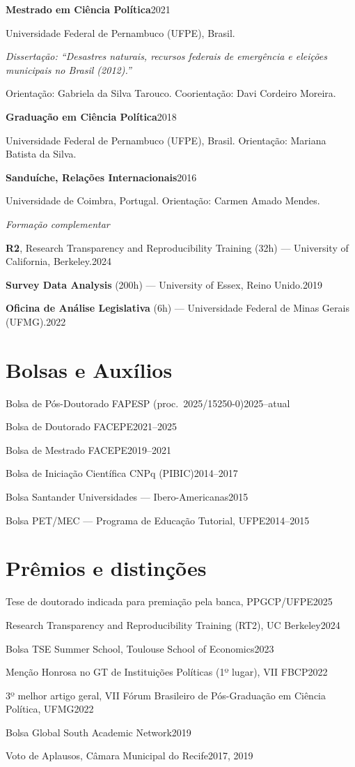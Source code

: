 \documentclass[11pt]{article}
\newcommand{\cvsubsection}[1]{\vspace{0.9em}\textit{#1}\par\vspace{0.35em}}
\newcommand{\entry}[2]{\noindent\textbf{#1}\hfill #2\par\vspace{0.15em}}
\newcommand{\entryplain}[2]{\noindent#1\hfill #2\par\vspace{0.15em}}
\newcommand{\detail}[1]{\noindent\hspace*{1.5em}#1\par\vspace{0.15em}}
\newcommand{\detailem}[1]{\noindent\hspace*{1.5em}\textit{#1}\par\vspace{0.15em}}
\begin{document}
\entry{Mestrado em Ciência Política}{2021}
\detail{Universidade Federal de Pernambuco (UFPE), Brasil.}
\detailem{Dissertação: ``Desastres naturais, recursos federais de emergência e eleições municipais no Brasil (2012).''}
\detail{Orientação: Gabriela da Silva Tarouco. Coorientação: Davi Cordeiro Moreira.}

\entry{Graduação em Ciência Política}{2018}
\detail{Universidade Federal de Pernambuco (UFPE), Brasil. Orientação: Mariana Batista da Silva.}

\entry{Sanduíche, Relações Internacionais}{2016}
\detail{Universidade de Coimbra, Portugal. Orientação: Carmen Amado Mendes.}

\cvsubsection{Formação complementar}

\entryplain{\textbf{R2}, Research Transparency and Reproducibility Training (32h) --- University of California, Berkeley.}{2024}

\entryplain{\textbf{Survey Data Analysis} (200h) --- University of Essex, Reino Unido.}{2019}

\entryplain{\textbf{Oficina de Análise Legislativa} (6h) --- Universidade Federal de Minas Gerais (UFMG).}{2022}

\section{Bolsas e Auxílios}

\entryplain{Bolsa de Pós-Doutorado FAPESP (proc.\ 2025/15250-0)}{2025--atual}
\entryplain{Bolsa de Doutorado FACEPE}{2021--2025}
\entryplain{Bolsa de Mestrado FACEPE}{2019--2021}
\entryplain{Bolsa de Iniciação Científica CNPq (PIBIC)}{2014--2017}
\entryplain{Bolsa Santander Universidades --- Ibero-Americanas}{2015}
\entryplain{Bolsa PET/MEC --- Programa de Educação Tutorial, UFPE}{2014--2015}

\section{Prêmios e distinções}

\entryplain{Tese de doutorado indicada para premiação pela banca, PPGCP/UFPE}{2025}
\entryplain{Research Transparency and Reproducibility Training (RT2), UC Berkeley}{2024}
\entryplain{Bolsa TSE Summer School, Toulouse School of Economics}{2023}
\entryplain{Menção Honrosa no GT de Instituições Políticas (1º lugar), VII FBCP}{2022}
\entryplain{3º melhor artigo geral, VII Fórum Brasileiro de Pós-Graduação em Ciência Política, UFMG}{2022}
\entryplain{Bolsa Global South Academic Network}{2019}
\entryplain{Voto de Aplausos, Câmara Municipal do Recife}{2017, 2019}
\end{document}

